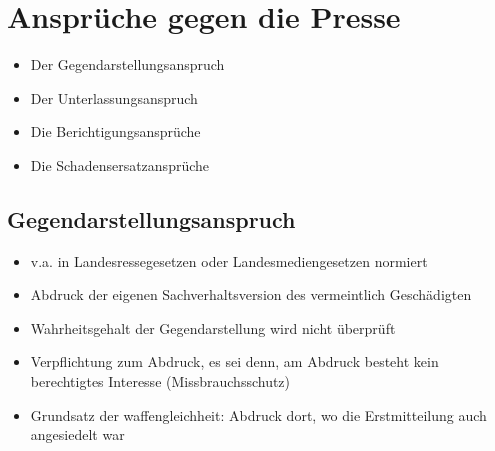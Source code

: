 \chapter{Ansprüche gegen die Presse}
\begin{itemize}
    \item Der Gegendarstellungsanspruch
    \item Der Unterlassungsanspruch
    \item Die Berichtigungsansprüche
    \item Die Schadensersatzansprüche
\end{itemize}
%
%
%
\section{Gegendarstellungsanspruch}
\begin{itemize}
    \item v.a. in Landesressegesetzen oder Landesmediengesetzen normiert
    \item Abdruck der eigenen Sachverhaltsversion des vermeintlich Geschädigten
    \item Wahrheitsgehalt der Gegendarstellung wird nicht überprüft
    \item Verpflichtung zum Abdruck, es sei denn, am Abdruck besteht kein berechtigtes Interesse (Missbrauchsschutz)
    \item Grundsatz der waffengleichheit: Abdruck dort, wo die Erstmitteilung auch angesiedelt war
\end{itemize}

